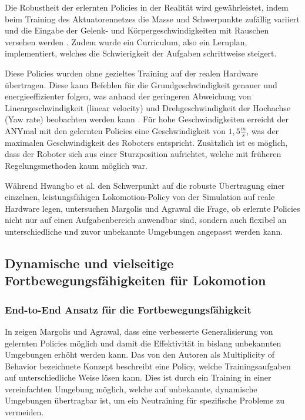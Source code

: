 Die Robustheit der erlernten Policies in der Realität wird gewährleistet, indem beim Training des Aktuatorennetzes die Masse und Schwerpunkte zufällig variiert und die Eingabe der Gelenk- und Körpergeschwindigkeiten mit Rauschen versehen werden \cite{hwangboLearningAgileDynamic2019}. Zudem wurde ein Curriculum, also ein Lernplan, implementiert, welches die Schwierigkeit der Aufgaben schrittweise steigert.

Diese Policies wurden ohne gezieltes Training auf der realen Hardware übertragen. Diese kann Befehlen für die Grundgeschwindigkeit genauer und energieeffizienter folgen, was anhand der geringeren Abweichung von Lineargeschwindigkeit (linear velocity) und Drehgeschwindigkeit der Hochachse (Yaw rate) beobachten werden kann \cite{hwangboLearningAgileDynamic2019}. Für hohe Geschwindigkeiten erreicht der ANYmal mit den gelernten Policies eine Geschwindigkeit von $1,5\frac{m}{s}$, was der maximalen Geschwindigkeit des Roboters entspricht. Zusätzlich ist es möglich, dass der Roboter sich aus einer Sturzposition aufrichtet, welche mit früheren Regelungsmethoden kaum möglich war.

\par\vspace{1em}

Während Hwangbo et al. den Schwerpunkt auf die robuste Übertragung einer einzelnen, leistungsfähigen Lokomotion-Policy von der Simulation auf reale Hardware legen, untersuchen Margolis und Agrawal die Frage, ob erlernte Policies nicht nur auf einen Aufgabenbereich anwendbar sind, sondern auch flexibel an unterschiedliche und zuvor unbekannte Umgebungen angepasst werden kann.

\subsection{Dynamische und vielseitige Fortbewegungsfähigkeiten für Lokomotion}

\subsubsection{End-to-End Ansatz für die Fortbewegungsfähigkeit}
In \cite{margolisWalkTheseWays2022} zeigen Margolis und Agrawal, dass eine verbesserte Generalisierung von gelernten Policies möglich und damit die Effektivität in bislang unbekannten Umgebungen erhöht werden kann. Das von den Autoren als Multiplicity of Behavior bezeichnete Konzept beschreibt eine Policy, welche Trainingsaufgaben auf unterschiedliche Weise lösen kann. Dies ist durch ein Training in einer vereinfachten Umgebung möglich, welche auf unbekannte, dynamische Umgebungen übertragbar ist, um ein Neutraining für spezifische Probleme zu vermeiden.

